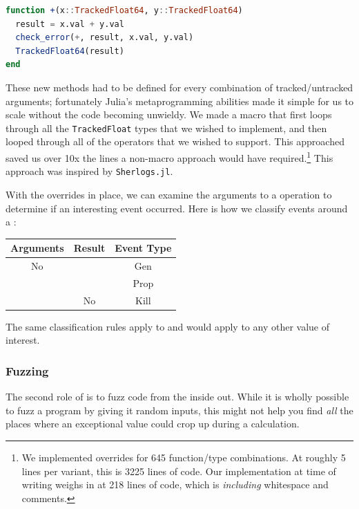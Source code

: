 \documentclass{juliacon}
\begin{document}
\begin{lstlisting}[language = Julia]
function +(x::TrackedFloat64, y::TrackedFloat64)
  result = x.val + y.val
  check_error(+, result, x.val, y.val)
  TrackedFloat64(result)
end
\end{lstlisting}

These new methods had to be defined for every combination of tracked/untracked arguments;
fortunately Julia's metaprogramming abilities made it simple for us to scale without the code becoming unwieldy.
We made a macro that first loops through all the \texttt{TrackedFloat} types that we wished to implement, and then looped through all of the operators that we wished to support.
This approached saved us over 10x the lines a non-macro approach would have required.\footnote{We implemented overrides for 645 function/type combinations. At roughly 5 lines per variant, this is 3225 lines of code. Our implementation at time of writing weighs in at 218 lines of code, which is \emph{including} whitespace and comments.}
This approach was inspired by \texttt{Sherlogs.jl}.\cite{kMilanklSherlogsJl2021}

With the overrides in place, we can examine the arguments to a \fp{} operation to determine if an interesting event occurred.
Here is how we classify events around a \NaN{}:

\begin{center}
  \begin{tabular}{ccc}
    Arguments & Result & Event Type \\
    \hline
    No \NaN{} & \NaN{} & Gen \\
    \NaN{} & \NaN{} & Prop \\
    \NaN{} & No \NaN{} & Kill \\
  \end{tabular}
\end{center}

The same classification rules apply to \Inf{} and would apply to any other value of interest.

\subsubsection{Fuzzing}

The second role of \FT{} is to fuzz code from the inside out.
While it is wholly possible to fuzz a program by giving it random inputs, this might not help you find \emph{all} the places where an exceptional value could crop up during a calculation.\cite{ddghlllprr-correctness-2022}
\end{document}
